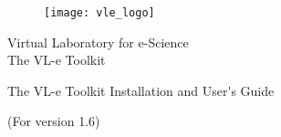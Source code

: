 %
% 

\begin{center}
\begin{figure}[htbp]
\centerline{\texttt{[image: vle\_logo]}}
\end{figure}

\vspace{5cm} 

{\Large Virtual Laboratory for e-Science}\\
{\Large The VL-e Toolkit}\\ 

\vspace{1cm} 
 
{\Huge The VL-e Toolkit Installation and User\'{}s Guide}\\ 

\vspace{1cm} 

{(For version 1.6)}\\
\vspace{0.5cm} 
\vspace{0.5cm} 

\\
\\
\end{center}

